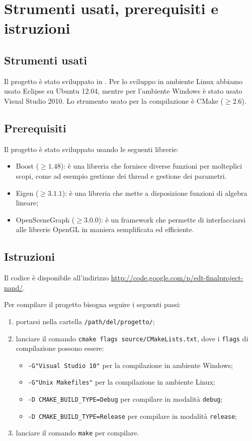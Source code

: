 \section{Strumenti usati, prerequisiti e istruzioni}
\subsection{Strumenti usati}
Il progetto è stato sviluppato in \cpp. Per lo sviluppo in ambiente Linux abbiamo usato Eclipse su Ubuntu 12.04, mentre per l'ambiente Windows è stato usato Visual Studio 2010. Lo strumento usato per la compilazione è CMake ($\geq 2.6$).

\subsection{Prerequisiti}
Il progetto è stato sviluppato usando le seguenti librerie:
\begin{itemize}[noitemsep]
  \item Boost ($\geq 1.48$): è una libreria che fornisce diverse funzioni per molteplici scopi, come ad esempio gestione dei thread e gestione dei parametri.
  \item Eigen ($\geq 3.1.1$): è una libreria che mette a disposizione funzioni di algebra lineare;
  \item OpenSceneGraph ($\geq 3.0.0$): è un framework che permette di interfacciarsi alle librerie OpenGL in maniera semplificata ed efficiente.
\end{itemize}

\subsection{Istruzioni}
Il codice è disponibile all'indirizzo \url{http://code.google.com/p/edt-finalproject-nand/}.

Per compilare il progetto bisogna seguire i seguenti passi:
\begin{enumerate}
  \item portarsi nella cartella \verb!/path/del/progetto/!;
  \item lanciare il comando \verb!cmake flags source/CMakeLists.txt!, dove i \verb!flags! di compilazione possono essere:
    \begin{itemize}[noitemsep]
      \item \verb!-G"Visual Studio 10"! per la compilazione in ambiente Windows;
      \item \verb!-G"Unix Makefiles"! per la compilazione in ambiente Linux;
    \end{itemize}
    \begin{itemize}[noitemsep]
      \item \verb!-D CMAKE_BUILD_TYPE=Debug! per compilare in modalità \verb!debug!;
      \item \verb!-D CMAKE_BUILD_TYPE=Release! per compilare in modalità \verb!release!;
    \end{itemize}
  \item lanciare il comando \verb!make! per compilare.
\end{enumerate}

